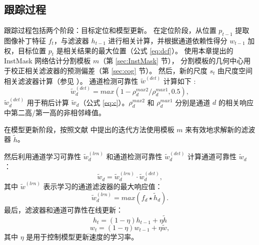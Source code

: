 \subsection{跟踪过程}
跟踪过程包括两个阶段：目标定位和模型更新。
在定位阶段，从位置 $p_{t-1}$ 提取图像补丁特征 $f_t$，与滤波器 $h_{t-1}$ 进行相关计算，并根据通道依赖性得分 $w_{t-1}$ 加权，目标位置 $p_t$ 是相关结果的最大位置（公式 \ref{eq:dcf}）。
使用本章提出的 InstMask 网络估计分割模板 $m$（第 \ref{sec:InstMask} 节），
分割模板的几何中心用于校正相关滤波器的预测偏差（第 \ref{sec:cog} 节）。
然后，新的尺度 $s_t$ 由尺度空间相关滤波器计算（参见 \cite{Danelljan2014AccurateSE}）。
通道检测可靠性 $\tilde{w}^{(det)}$ 计算如下 \cite{Lukezic2017DiscriminativeCF}:
\begin{equation} \label{eq:det}
\tilde w_d^{(det)} = max(1 - \rho_d^{max2} / \rho_d^{max1}, 0.5),
\end{equation}
$\tilde w_d^{(det)}$ 用于稍后计算 $\tilde w_d$（公式 \ref{eq:c}）。$\rho_d^{max2}$ 和 $\rho_d^{max1}$ 分别是通道 $d$ 的相关响应中第二高/第一高的非相邻峰值。

在模型更新阶段，按照文献 \cite{Lukezic2017DiscriminativeCF} 中提出的迭代方法使用模板 $m$ 来有效地求解新的滤波器 $\tilde{h}$。

然后利用通道学习可靠性 $\tilde w_d^{(lrn)}$ 和通道检测可靠性 $\tilde w_d^{(det)}$ 计算通道可靠性 $\tilde w_d$ \cite{Lukezic2017DiscriminativeCF}：
\begin{equation} \label{eq:c}
\tilde w_d = \tilde w_d^{(lrn)} \cdot \tilde w_d^{(det)},
\end{equation}
其中 $\tilde{w}^{(lrn)}$ 表示学习的通道滤波器的最大响应值：
\begin{equation} \label{eq:lrn}
\tilde{w}_d^{(lrn)} = max(f_d \star \tilde h_d).
\end{equation}
最后，滤波器和通道可靠性在线更新：\begin{equation} \label{eq:update1}
h_t = (1 - \eta)h_{t-1} + \eta \tilde{h}
\end{equation}
\begin{equation} \label{eq:update2}
w_t = (1-\eta)w_{t-1} + \eta \tilde{w},
\end{equation}
其中 $\eta$ 是用于控制模型更新速度的学习率。

